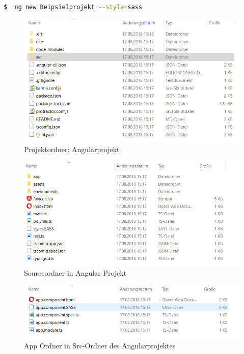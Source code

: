 \begin{lstlisting}[language=sh, frame=single]
$  ng new Beipsielprojekt --style=sass
\end{lstlisting} 


\begin{figure}[H]
	\centering
	
	\includegraphics[scale=0.9]{content/pictures/projektordner.png}
	\caption{ Projektordner: Angularprojekt}
	\label{fig:projektfolder}
\end{figure}

\begin{figure}[H]
	\centering
	\includegraphics[scale=0.9]{content/pictures/srcfolder.png}
	\caption{ Sourceordner in Angular Projekt}
	\label{fig:scrfolder}
\end{figure}

\begin{figure}[H]
	\centering
	\includegraphics[scale=0.9]{content/pictures/appfolder.png}
	\caption{ App Ordner in Src-Ordner des Angularprojektes}
	\label{fig:appfolder}
\end{figure}


